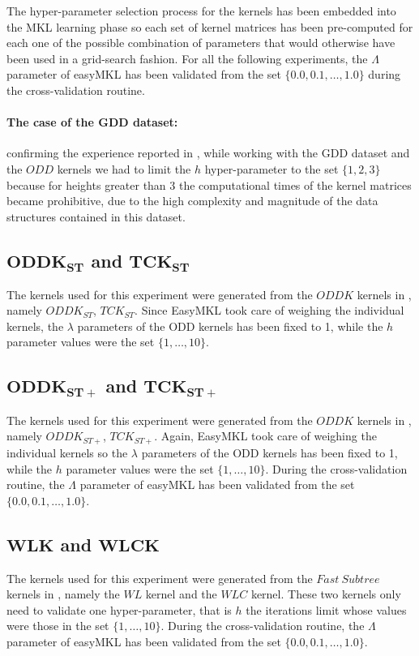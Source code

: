 The hyper-parameter selection process for the kernels has been embedded
into the MKL learning phase so each set of kernel matrices has been
pre-computed for each one of the possible combination of parameters that would
otherwise have been used in a grid-search fashion.
For all the following experiments, the $\Lambda$ parameter of easyMKL has been
validated from the set $\{0.0, 0.1,\dots,1.0\}$ during the cross-validation
routine.

\paragraph{The case of the GDD dataset:}
\label{par:gdd}
confirming the experience reported in \cite{rtesselli}, while working with the GDD
dataset and the $ODD$ kernels we had to limit the $h$ hyper-parameter to the set
$\{1,2,3\}$ because for heights greater than 3 the computational times of the
kernel matrices became prohibitive, due to the high complexity and magnitude
of the data structures contained in this dataset.


\subsection[$ODDK_{ST}$ and $TCK_{ST}$]{$\boldsymbol{ODDK_{ST}}$ and $\boldsymbol{TCK_{ST}}$}
The kernels used for this experiment were generated from the $ODDK$ kernels
in \cite{DBLP:conf/sdm/MartinoNS12, Navarin2015}, namely $ODDK_{ST}$, $TCK_{ST}$.
Since EasyMKL took care of weighing the individual kernels, the $\lambda$
parameters of the ODD kernels has been fixed to 1, while the $h$ parameter
values were the set $\{1,\dots,10\}$.

\subsection[$ODDK_{ST+}$ and $TCK_{ST+}$]{$\boldsymbol{ODDK_{ST+}}$ and $\boldsymbol{TCK_{ST+}}$}
The kernels used for this experiment were generated from the $ODDK$ kernels
in \cite{dasanmartino2015exploiting, rtesselli}, namely $ODDK_{ST+}$, $TCK_{ST+}$.
Again, EasyMKL took care of weighing the individual kernels so the $\lambda$
parameters of the ODD kernels has been fixed to 1, while the $h$ parameter
values were the set $\{1,\dots,10\}$.
During the cross-validation routine, the $\Lambda$ parameter of easyMKL has been
validated from the set $\{0.0, 0.1,\dots,1.0\}$.

\subsection[$WL$ and $WLC$]{$\boldsymbol{WLK}$ and $\boldsymbol{WLCK}$}
The kernels used for this experiment were generated from the $Fast~Subtree$ kernels
in \cite{NIPS2009_3813, rtesselli}, namely the $WL$ kernel and the $WLC$ kernel.
These two kernels only need to validate one hyper-parameter, that is $h$ the iterations
limit whose values were those in the set $\{1,\dots,10\}$.
During the cross-validation routine, the $\Lambda$ parameter of easyMKL has been
validated from the set $\{0.0, 0.1,\dots,1.0\}$.

